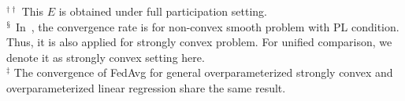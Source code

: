 \begin{table}[h!]
{         $^{\dagger\dagger}$ This $E$ is obtained under full participation setting. \\ 
         $^{\mathsection}$ In~\cite{haddadpour2019convergence}, the convergence rate is for non-convex smooth problem with PL condition. Thus, it is also applied for strongly convex problem. For unified comparison, we denote it as strongly convex setting here. \\
         $^{\ddagger}$ The convergence of FedAvg for general overparameterized strongly convex and overparameterized linear regression share the same result.  \par}
\label{tb:convergenceratev3}
\end{table}





